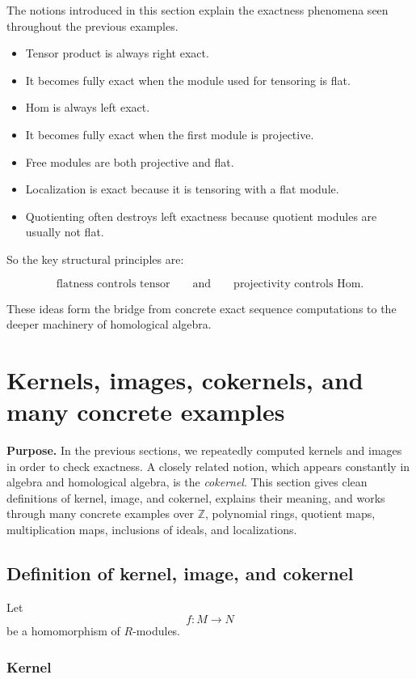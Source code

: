 \documentclass[12pt,a4paper]{article}
\theoremstyle{notespace}
\theoremstyle{definition}
\begin{document}
The notions introduced in this section explain the exactness phenomena seen throughout the previous examples.

\begin{itemize}
	\item Tensor product is always right exact.
	\item It becomes fully exact when the module used for tensoring is flat.
	\item Hom is always left exact.
	\item It becomes fully exact when the first module is projective.
	\item Free modules are both projective and flat.
	\item Localization is exact because it is tensoring with a flat module.
	\item Quotienting often destroys left exactness because quotient modules are usually not flat.
\end{itemize}

So the key structural principles are:

\[
\text{flatness controls tensor}
\qquad\text{and}\qquad
\text{projectivity controls Hom.}
\]

These ideas form the bridge from concrete exact sequence computations to the deeper machinery of homological algebra.


\section{Kernels, images, cokernels, and many concrete examples}

\textbf{Purpose.}
In the previous sections, we repeatedly computed kernels and images in order to check exactness.
A closely related notion, which appears constantly in algebra and homological algebra, is the \emph{cokernel}.
This section gives clean definitions of kernel, image, and cokernel, explains their meaning, and works through many concrete examples over \(\mathbb Z\), polynomial rings, quotient maps, multiplication maps, inclusions of ideals, and localizations.

\subsection{ Definition of kernel, image, and cokernel}

Let
\[
f:M\longrightarrow N
\]
be a homomorphism of \(R\)-modules.

\subsubsection*{Kernel}
\end{document}

